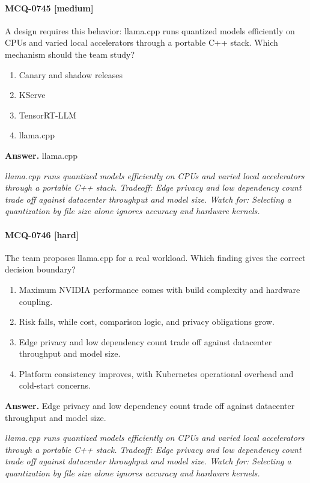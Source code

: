 \paragraph{MCQ-0745 [medium]} A design requires this behavior: llama.cpp runs quantized models efficiently on CPUs and varied local accelerators through a portable C++ stack. Which mechanism should the team study?
\begin{enumerate}[label=\Alph*.]
\item Canary and shadow releases
\item KServe
\item TensorRT-LLM
\item llama.cpp
\end{enumerate}
\noindent\textbf{Answer.} llama.cpp
\par\textit{llama.cpp runs quantized models efficiently on CPUs and varied local accelerators through a portable C++ stack. Tradeoff: Edge privacy and low dependency count trade off against datacenter throughput and model size. Watch for: Selecting a quantization by file size alone ignores accuracy and hardware kernels.}
\paragraph{MCQ-0746 [hard]} The team proposes llama.cpp for a real workload. Which finding gives the correct decision boundary?
\begin{enumerate}[label=\Alph*.]
\item Maximum NVIDIA performance comes with build complexity and hardware coupling.
\item Risk falls, while cost, comparison logic, and privacy obligations grow.
\item Edge privacy and low dependency count trade off against datacenter throughput and model size.
\item Platform consistency improves, with Kubernetes operational overhead and cold-start concerns.
\end{enumerate}
\noindent\textbf{Answer.} Edge privacy and low dependency count trade off against datacenter throughput and model size.
\par\textit{llama.cpp runs quantized models efficiently on CPUs and varied local accelerators through a portable C++ stack. Tradeoff: Edge privacy and low dependency count trade off against datacenter throughput and model size. Watch for: Selecting a quantization by file size alone ignores accuracy and hardware kernels.}
